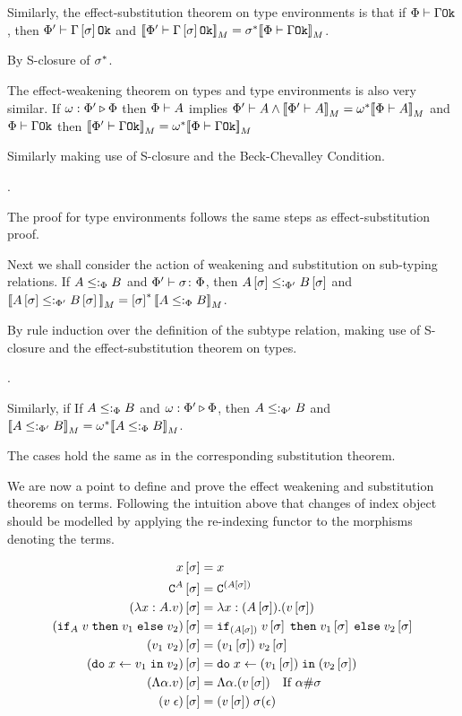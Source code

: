 \documentclass{Report}
\begin{document}
Similarly, the effect-substitution theorem on type environments is that if $\Phi\vdash \Gamma \texttt{Ok}$, then $\Phi'\vdash \Gamma\left[\sigma\right] \texttt{Ok}$ and ${\bf [\![}\Phi'\vdash \Gamma\left[\sigma\right] \texttt{Ok}{\bf ]\!]}_M = \sigma^*{\bf [\![}\Phi\vdash \Gamma \texttt{Ok}{\bf ]\!]}_M$.

\proof By S-closure of $\sigma^*$.

The effect-weakening theorem on types and type environments is also very similar. If $\omega : \Phi' \triangleright \Phi$ then $\Phi\vdash A$ implies $\Phi'\vdash A \wedge {\bf [\![}\Phi'\vdash A{\bf ]\!]}_M = \omega^*{\bf [\![}\Phi\vdash A{\bf ]\!]}_M$ and $\Phi\vdash \Gamma \texttt{Ok}$ then ${\bf [\![}\Phi'\vdash \Gamma \texttt{Ok}{\bf ]\!]}_M = \omega^*{\bf [\![}\Phi\vdash \Gamma \texttt{Ok}{\bf ]\!]}_M$

\proof
Similarly making use of S-closure and the Beck-Chevalley Condition.

.

The proof for type environments follows the same steps as effect-substitution proof.


Next we shall consider the action of weakening and substitution on sub-typing relations. If $A \leq:_\Phi B$ and $\Phi' \vdash \sigma \colon \Phi$, then $A\left[\sigma\right]\leq:_{\Phi'} B\left[\sigma\right]$ and ${\bf [\![}A\left[\sigma\right]\leq:_{\Phi'} B\left[\sigma\right]{\bf ]\!]}_M = \left[\sigma\right]^*{\bf [\![}A\leq:_\Phi B{\bf ]\!]}_M$.

\proof
By rule induction over the definition of the subtype relation, making use of S-closure and the effect-substitution theorem on types.

.

Similarly, if If $A \leq:_\Phi B$ and $\omega : \Phi' \triangleright \Phi$, then $A \leq:_{\Phi'} B$ and ${\bf [\![}A\leq:_{\Phi'} B{\bf ]\!]}_M = \omega^*{\bf [\![}A\leq:_\Phi B{\bf ]\!]}_M$.

\proof
The cases hold the same as in the corresponding substitution theorem.


We are now a point to define and prove the effect weakening and substitution theorems on terms. Following the intuition above that changes of index object should be modelled by applying the re-indexing functor to the morphisms denoting the terms.

\begin{align*}
    x\left[\sigma\right] & = x \\
    \texttt{C}^{A}\left[\sigma\right] & = \texttt{C}^{(A\left[\sigma\right])} \\
    (\lambda x : A. v)\left[\sigma\right] &= \lambda x : (A\left[\sigma\right]). (v\left[\sigma\right])\\
    (\texttt{if}_{A}\; v\; \texttt{then}\; v_1 \;\texttt{else} \; v_2)\left[\sigma\right] &= \texttt{if}_{(A\left[\sigma\right])}\; v\left[\sigma\right]\; \texttt{then}\; v_1\left[\sigma\right] \;\texttt{else} \; v_2\left[\sigma\right]\\
    (v_1\; v_2)\left[\sigma\right]&= (v_1\left[\sigma\right])\; v_2\left[\sigma\right]\\
    (\texttt{do}\; x \leftarrow v_1 \;\texttt{in}\; v_2)\left[\sigma\right]&= \texttt{do}\; x \leftarrow (v_1\left[\sigma\right]) \;\texttt{in}\; (v_2\left[\sigma\right])\\
    (\Lambda \alpha. v)\left[\sigma\right] & = \Lambda \alpha. (v\left[\sigma\right])\quad\text{If $\alpha\#\sigma$}\\
    (v\;\epsilon)\left[\sigma\right] & = (v\left[\sigma\right])\;\sigma(\epsilon)\\
\end{align*}
\end{document}
